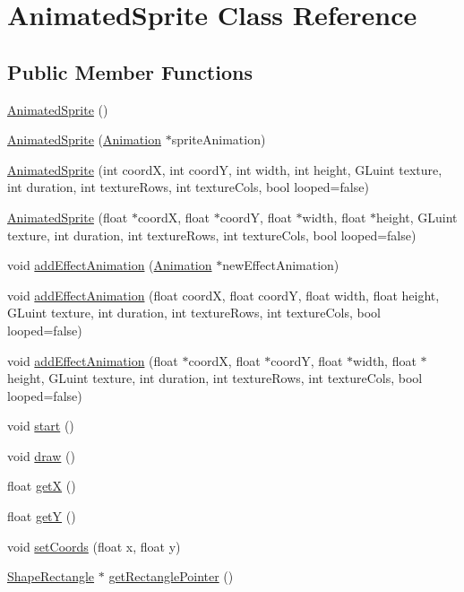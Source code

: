\hypertarget{class_animated_sprite}{}\section{Animated\+Sprite Class Reference}
\label{class_animated_sprite}
\subsection*{Public Member Functions}
\begin{DoxyCompactItemize}
\item 
\hyperlink{class_animated_sprite_a1147eb833593fa4c28854b96a84413a9}{Animated\+Sprite} ()
\item 
\hyperlink{class_animated_sprite_a448073993861b75ad4036e5f598d69c2}{Animated\+Sprite} (\hyperlink{class_animation}{Animation} $\ast$sprite\+Animation)
\item 
\hyperlink{class_animated_sprite_aa2c1e1e129958d433ec53a77c264ec48}{Animated\+Sprite} (int coord\+X, int coord\+Y, int width, int height, G\+Luint texture, int duration, int texture\+Rows, int texture\+Cols, bool looped=false)
\item 
\hyperlink{class_animated_sprite_a50f8ae7feb5eae0bc4fa2f2682530848}{Animated\+Sprite} (float $\ast$coord\+X, float $\ast$coord\+Y, float $\ast$width, float $\ast$height, G\+Luint texture, int duration, int texture\+Rows, int texture\+Cols, bool looped=false)
\item 
void \hyperlink{class_animated_sprite_abe23be53e97688105ce0e73376b7f1aa}{add\+Effect\+Animation} (\hyperlink{class_animation}{Animation} $\ast$new\+Effect\+Animation)
\item 
void \hyperlink{class_animated_sprite_a9b3686a30256e69e35da3c066374bf30}{add\+Effect\+Animation} (float coord\+X, float coord\+Y, float width, float height, G\+Luint texture, int duration, int texture\+Rows, int texture\+Cols, bool looped=false)
\item 
void \hyperlink{class_animated_sprite_adb3abbec1ef8b02430eabb4ac7d9284f}{add\+Effect\+Animation} (float $\ast$coord\+X, float $\ast$coord\+Y, float $\ast$width, float $\ast$height, G\+Luint texture, int duration, int texture\+Rows, int texture\+Cols, bool looped=false)
\item 
void \hyperlink{class_animated_sprite_adc3e6d7cfb89df9ef4d2ae4f45a39703}{start} ()
\item 
void \hyperlink{class_animated_sprite_a4992201e79a2c2b0c4b17a288193dca9}{draw} ()
\item 
float \hyperlink{class_animated_sprite_a5a6e251f4cc5a241972534701e8f90bb}{get\+X} ()
\item 
float \hyperlink{class_animated_sprite_abf1c1c5beaf1c2c9257d11698cb0afb6}{get\+Y} ()
\item 
void \hyperlink{class_animated_sprite_a628acd87e40dff70886864532ce9486c}{set\+Coords} (float x, float y)
\item 
\hyperlink{class_shape_rectangle}{Shape\+Rectangle} $\ast$ \hyperlink{class_animated_sprite_a259fa1a5d07061e7fe726d5e39f46b24}{get\+Rectangle\+Pointer} ()
\end{DoxyCompactItemize}


